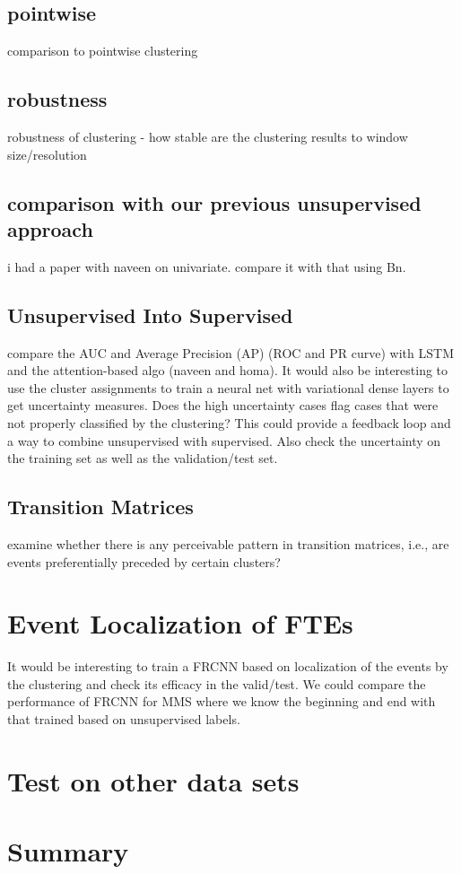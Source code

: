 \documentclass[aps,preprint,superscriptaddress]{revtex4}
\begin{document}
\subsection{pointwise}
comparison to pointwise clustering
\subsection{robustness}
robustness of clustering - how stable are the clustering results to window size/resolution
\subsection{comparison with our previous unsupervised approach}
i had a paper with naveen on univariate. compare it with that using Bn.

\subsection{Unsupervised Into Supervised}
compare the AUC and Average Precision (AP) (ROC and PR curve) with LSTM and the attention-based algo (naveen and homa).  It would also be interesting to use the cluster assignments to train a neural net with variational dense layers to get uncertainty measures. Does the high uncertainty cases flag cases that were not properly classified by the clustering? This could provide a feedback loop and a way to combine unsupervised with supervised. 
Also check the uncertainty on the training set as well as the validation/test set.  
\label{sec:supervised}

\subsection{Transition Matrices}
examine whether there is any perceivable pattern in transition matrices, i.e., are events preferentially preceded by certain clusters?
\label{sec:transition}


\section{Event Localization of FTEs}
\label{sec:manifolderFTE2}
It would be interesting to train a FRCNN based on localization of the events by the clustering and check its efficacy in the valid/test. We could compare the performance of FRCNN for MMS where we know the beginning and end with that trained based on unsupervised labels.


\section{Test on other data sets}
\label{sec:manifolderother}


\label{sec:feature}

\section{Summary}
\label{sec:summary}

\begin{acknowledgments}

\end{acknowledgments}
\end{document}

